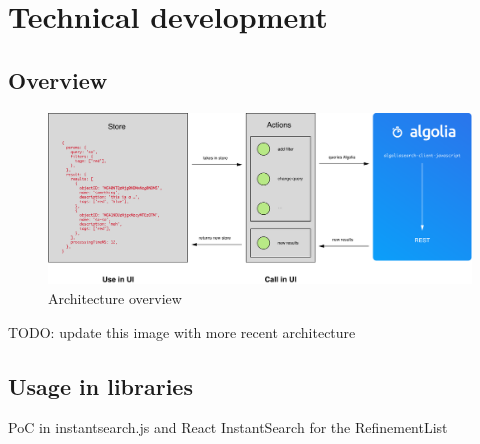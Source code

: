 
\chapter{Technical development} %
\label{chp:execution}








\section{Overview} %
\label{sec:overview}

\begin{figure}[H]
  \centering
  \includegraphics[width=\textwidth]{../assets/architecture.pdf}
  \caption{Architecture overview\cite{blog-architecture}}
  \label{figure:core-architecture}
\end{figure}

TODO: update this image with more recent architecture %


\section{Usage in libraries} %
\label{sec:usage_in_libraries}

PoC in instantsearch.js and React InstantSearch for the RefinementList %

